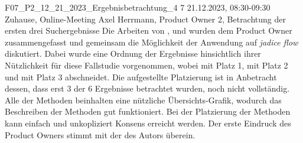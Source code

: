 \fieldnote
{F07\_P2\_12\_21\_2023\_Ergebnisbetrachtung\_4}
{7}
{21.12.2023, 08:30-09:30}
{Zuhause, Online-Meeting}
{Axel Herrmann, Product Owner}
{2, Betrachtung der ersten drei Suchergebnisse}
{
	Die Arbeiten von ,  und  wurden dem Product Owner zusammengefasst und gemeinsam die Möglichkeit der Anwendung auf \emph{jadice flow} diskutiert.
  Dabei wurde eine Ordnung der Ergebnisse hinsichtlich ihrer Nützlichkeit für diese Fallstudie vorgenommen, wobei  mit Platz 1,  mit Platz 2 und  mit Platz 3 abschneidet.
}
{
	Die aufgestellte Platzierung ist in Anbetracht dessen, dass erst 3 der 6 Ergebnisse betrachtet wurden, noch nicht vollständig.
}
{
  Alle der Methoden beinhalten eine nützliche Übersichts-Grafik, wodurch das Beschreiben der Methoden gut funktioniert.
  Bei der Platzierung der Methoden kann einfach und unkopliziert Konsens erreicht werden.
}
{}
{
	Der erste Eindruck des Product Owners stimmt mit der des Autors überein.
}
